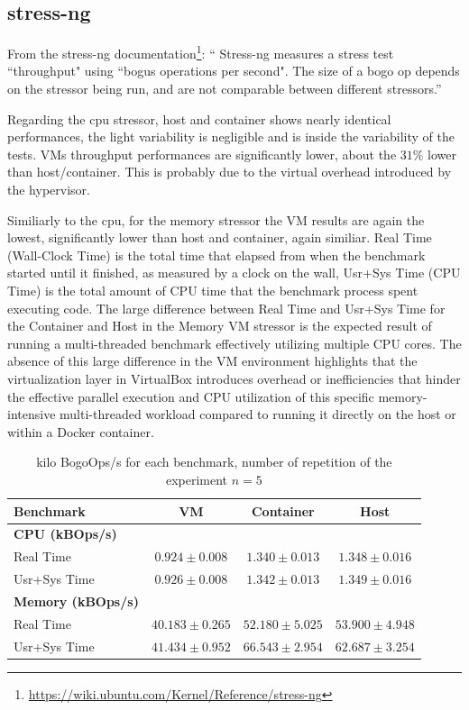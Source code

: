 \subsection{stress-ng}

From the stress-ng documentation\footnote{\url{https://wiki.ubuntu.com/Kernel/Reference/stress-ng}}: `` Stress-ng measures a stress test ``throughput" using ``bogus operations per second". The size of a bogo op depends on the stressor being run, and are not comparable between different stressors.''

Regarding the cpu stressor, host and container shows nearly identical performances, the light variability is negligible and is inside the variability of the tests. VMs throughput performances are significantly lower, about the $31\%$ lower than host/container. This is probably due to the virtual overhead introduced by the hypervisor.

Similiarly to the cpu, for the memory stressor the VM results are again the lowest, significantly lower than host and container, again similiar. 
Real Time (Wall-Clock Time) is the total time that elapsed from when the benchmark started until it finished, as measured by a clock on the wall, Usr+Sys Time (CPU Time) is the total amount of CPU time that the benchmark process spent executing code.
The large difference between Real Time and Usr+Sys Time for the Container and Host in the Memory VM stressor is the expected result of running a multi-threaded benchmark effectively utilizing multiple CPU cores. The absence of this large difference in the VM environment highlights that the virtualization layer in VirtualBox introduces overhead or inefficiencies that hinder the effective parallel execution and CPU utilization of this specific memory-intensive multi-threaded workload compared to running it directly on the host or within a Docker container.

\begin{table}[H]
    \centering
    \begin{tabular}{lccc}
    \toprule
    \textbf{Benchmark} & \textbf{VM} & \textbf{Container} & \textbf{Host} \\
    \midrule
    \textbf{CPU (kBOps/s)} & & & \\
    Real Time & $0.924 \pm 0.008$ & $1.340 \pm 0.013$ & $1.348 \pm 0.016$ \\
    Usr+Sys Time & $0.926 \pm 0.008$ & $1.342 \pm 0.013$ & $1.349 \pm 0.016$ \\
    \midrule
    \textbf{Memory (kBOps/s)} & & & \\
    Real Time & $40.183 \pm 0.265$ & $52.180 \pm 5.025$ & $53.900 \pm 4.948$ \\
    Usr+Sys Time & $41.434 \pm 0.952$ & $66.543 \pm 2.954$ & $62.687 \pm 3.254$ \\
    \bottomrule
    \end{tabular}
    \caption{kilo BogoOps/s for each benchmark, number of repetition of the experiment $n=5$}
    \label{tab:my_label}
\end{table}
